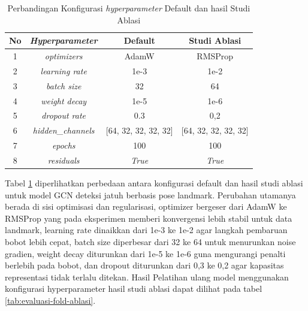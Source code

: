 \begin{table}[htbp]
    \centering
    \caption{Perbandingan Konfigurasi \textit{hyperparameter} Default dan hasil Studi Ablasi}
    \label{tab:hyperparams-default-ablasi}
    \begin{tabular}{|c|c|c|c|}
        \hline
        \textbf{No} & \textbf{\textit{Hyperparameter}} & \textbf{Default} & \textbf{Studi Ablasi} \\ \hline
        1 & \textit{optimizers}          & AdamW & RMSProp\\ \hline        
        2 & \textit{learning rate}     & 1e-3 & 1e-2 \\ \hline
        3 & \textit{batch size}        & 32 & 64 \\ \hline
        4 & \textit{weight decay}      & 1e-5 & 1e-6 \\ \hline
        5 & \textit{dropout rate}      & 0.3 & 0,2 \\ \hline
        6 & \textit{hidden\_channels}    & [64, 32, 32, 32, 32] & [64, 32, 32, 32, 32] \\ \hline
        7 & \textit{epochs}              & 100 & 100 \\ \hline
        8 & \textit{residuals}           & \textit{True} & \textit{True} \\ \hline
    \end{tabular}
\end{table}

Tabel \ref{tab:hyperparams-default-ablasi} diperlihatkan perbedaan antara konfigurasi default dan hasil studi ablasi untuk model GCN deteksi jatuh berbasis pose landmark. Perubahan utamanya berada di sisi optimisasi dan regularisasi, optimizer bergeser dari AdamW ke RMSProp yang pada eksperimen memberi konvergensi lebih stabil untuk data landmark, learning rate dinaikkan dari 1e-3 ke 1e-2 agar langkah pembaruan bobot lebih cepat, batch size diperbesar dari 32 ke 64 untuk menurunkan noise gradien, weight decay diturunkan dari 1e-5 ke 1e-6 guna mengurangi penalti berlebih pada bobot, dan dropout diturunkan dari 0,3 ke 0,2 agar kapasitas representasi tidak terlalu ditekan. Hasil Pelatihan ulang model menggunakan konfigurasi hyperparameter hasil studi ablasi dapat dilihat pada tabel \ref{tab:evaluasi-fold-ablasi}.


